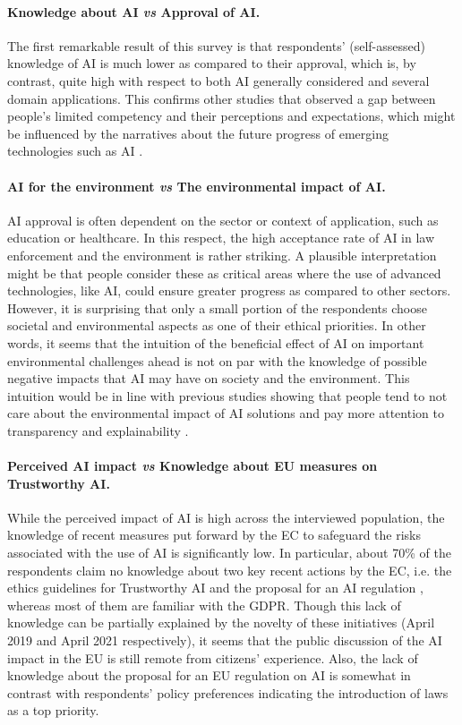 \documentclass{article}
\begin{document}
\paragraph{\textbf{Knowledge about AI \emph{vs} Approval of AI}.}
The first remarkable result of this survey is that respondents' (self-assessed) knowledge of AI is much lower as compared to their approval, which is, by contrast, quite high with respect to both AI generally considered and several domain applications. This confirms other studies that observed a gap between people's limited competency and their perceptions and expectations, which might be influenced by the narratives about the future progress of emerging technologies such as AI \cite{TRS}.

\paragraph{\textbf{AI for the environment \emph{vs} The environmental impact of AI}.}
AI approval is often dependent on the sector or context of application, such as education or healthcare. In this respect, the high acceptance rate of AI in law enforcement and the environment is rather striking. A plausible interpretation might be that people consider these as critical areas where the use of advanced technologies, like AI, could ensure greater progress as compared to other sectors. However, it is surprising that only a small portion of the respondents choose societal and environmental aspects as one of their ethical priorities. In other words, it seems that the intuition of the beneficial effect of AI on important environmental challenges ahead is not on par with the knowledge of possible negative impacts that AI may have on society and the environment. This intuition would be in line with previous studies showing that people tend to not care about the environmental impact of AI solutions and pay more attention to transparency and explainability \cite{konig2022consumers}.

\paragraph{\textbf{Perceived AI impact \emph{vs} Knowledge about EU measures on Trustworthy AI}.}
While the perceived impact of AI is high across the interviewed population, the knowledge of recent measures put forward by the EC to safeguard the risks associated with the use of AI is significantly low. In particular, about 70\% of the respondents claim no knowledge about two key recent actions by the EC, i.e. the ethics guidelines for Trustworthy AI \cite{Trustworthy_EU} and the proposal for an AI regulation \cite{ai_act}, whereas most of them are familiar with the GDPR. Though this lack of knowledge can be partially explained by the novelty of these initiatives (April 2019 and April 2021 respectively), it seems that the public discussion of the AI impact in the EU is still remote from citizens' experience. Also, the lack of knowledge about the proposal for an EU regulation on AI is somewhat in contrast with respondents' policy preferences indicating the introduction of laws as a top priority. 
\end{document}
